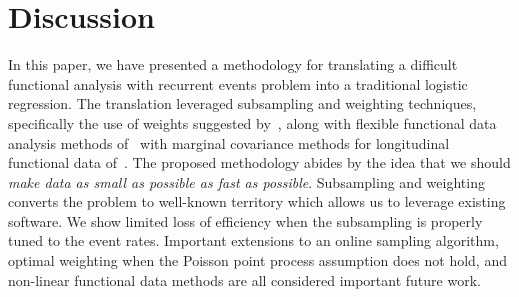 \documentclass[12pt]{amsart}
\begin{document}


\section{Discussion}
In this paper, we have presented a methodology for translating a difficult functional analysis with recurrent events problem into a traditional logistic regression.  The translation leveraged subsampling and weighting techniques, specifically the use of weights suggested by~\cite{Waagepetersen2008}, along with flexible functional data analysis methods of~\cite{Goldsmith2011} with marginal covariance methods for longitudinal functional data of~\cite{Park2018}.  The proposed methodology abides by the idea that we should \emph{make data as small as possible as fast as possible}.  Subsampling and  weighting converts the problem to well-known territory which allows us to leverage existing software.  We show limited loss of efficiency when the subsampling is properly tuned to the event rates.  Important extensions to an online sampling algorithm, optimal weighting when the Poisson point process assumption does not hold, and non-linear functional data methods are all considered important future work.





\end{document}
